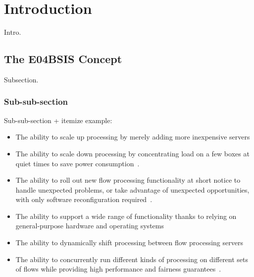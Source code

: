 \section{Introduction}
Intro.

\subsection {The E04BSIS Concept}

Subsection.  

\subsubsection{Sub-sub-section}

Sub-sub-section + itemize example:

\begin{itemize}
  \item The ability to scale up processing by merely adding more inexpensive servers
  \item The ability to scale down processing by concentrating load on a few boxes
    at quiet times to save power consumption~\cite{latexcompanion}.
  \item The ability to roll out new flow processing functionality at short notice
    to handle unexpected problems, or take advantage of unexpected opportunities,
    with only software reconfiguration required~\cite{einstein}.
  \item The ability to support a wide range of functionality thanks to relying on
    general-purpose hardware and operating systems
  \item The ability to dynamically shift processing between flow processing servers
  \item The ability to concurrently run different kinds of processing on
    different sets of flows while providing high performance and fairness
    guarantees~\cite{knuthwebsite}.
\end{itemize}


